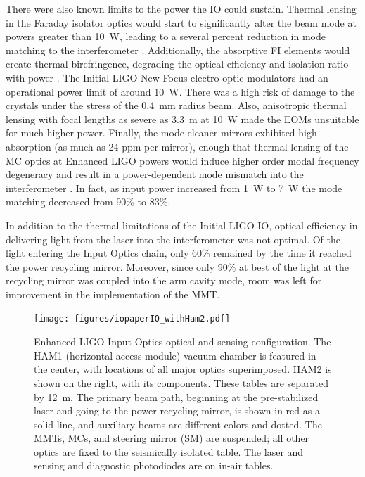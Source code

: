 There were also known limits to the power the IO could sustain.
Thermal lensing in the Faraday isolator optics would start to
significantly alter the beam mode at powers greater than 10~W, leading
to a several percent reduction in mode matching to the interferometer
\citep{UFLIGOGroup2006Upgrading}.  Additionally, the absorptive FI
elements would create thermal birefringence, degrading the optical
efficiency and isolation ratio with power
\citep{Khazanov1999Investigation}.  The Initial LIGO New Focus
electro-optic modulators had an operational power limit of around
10~W. There was a high risk of damage to the crystals under the stress
of the 0.4~mm radius beam. Also, anisotropic thermal lensing with
focal lengths as severe as 3.3~m at 10~W made the EOMs unsuitable for
much higher power. Finally, the mode cleaner mirrors exhibited high
absorption (as much as 24 ppm per mirror), enough that thermal lensing
of the MC optics at Enhanced LIGO powers would induce higher order
modal frequency degeneracy and result in a power-dependent mode
mismatch into the interferometer \citep{Bullington2008Modal,
  Arain2007Note}. In fact, as input power increased from 1~W to 7~W
the mode matching decreased from 90\% to 83\%.

In addition to the thermal limitations of the Initial LIGO IO, optical
efficiency in delivering light from the laser into the interferometer
was not optimal. Of the light entering the Input Optics chain, only
60\% remained by the time it reached the power recycling
mirror. Moreover, since only 90\% at best of the light at the
recycling mirror was coupled into the arm cavity mode, room was left
for improvement in the implementation of the MMT.


\begin{figure}
\begin{centering}
\texttt{[image: figures/iopaperIO\_withHam2.pdf]}
\caption[Enhanced LIGO Input Optics optical and sensing
  configuration]{Enhanced LIGO Input Optics optical and sensing
  configuration. The HAM1 (horizontal access module) vacuum chamber is
  featured in the center, with locations of all major optics
  superimposed. HAM2 is shown on the right, with its components. These
  tables are separated by 12~m. The primary beam path, beginning at
  the pre-stabilized laser and going to the power recycling mirror, is
  shown in red as a solid line, and auxiliary beams are different
  colors and dotted. The MMTs, MCs, and steering mirror (SM) are
  suspended; all other optics are fixed to the seismically isolated
  table. The laser and sensing and diagnostic photodiodes are on
  in-air tables.}
\label{fig:IOschematic}
\end{centering}
\end{figure}

